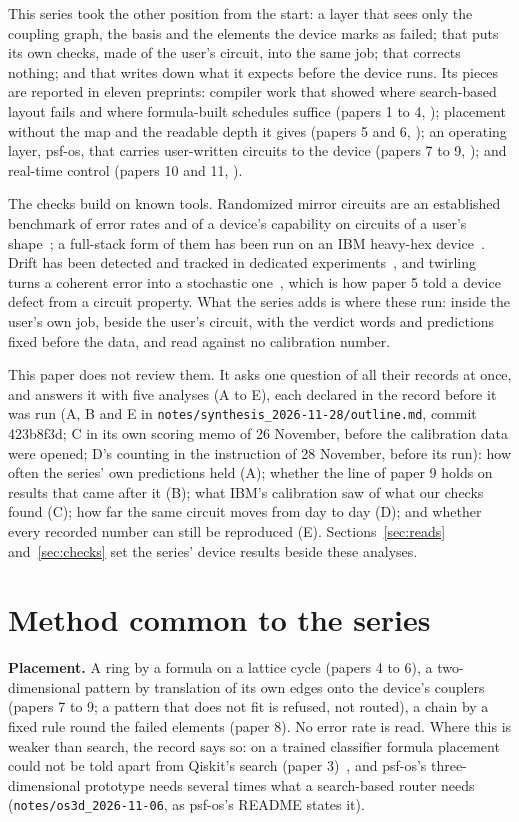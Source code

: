 \documentclass[10pt,a4paper]{article}
\begin{document}
This series took the other position from the start: a layer that sees only the coupling graph, the basis and the
elements the device marks as failed; that puts its own checks, made of the user's circuit, into the same job; that
corrects nothing; and that writes down what it expects before the device runs. Its pieces are reported in eleven
preprints: compiler work that showed where search-based layout fails and where formula-built schedules suffice
(papers 1 to 4, \cite{p1,p2,p3,p4}); placement without the map and the readable depth it gives (papers 5 and 6,
\cite{p5,p6}); an operating layer, psf-os, that carries user-written circuits to the device (papers 7 to 9,
\cite{p7,p8,p9}); and real-time control (papers 10 and 11, \cite{p10,p11}).

The checks build on known tools. Randomized mirror circuits are an established benchmark of error rates and of a device's
capability on circuits of a user's shape~\cite{proctor2022prl,proctor2022natphys}; a
full-stack form of them has been run on an IBM heavy-hex device~\cite{hines2023}. Drift has been detected and tracked in
dedicated experiments~\cite{proctor2020drift}, and twirling turns a coherent error into a
stochastic one~\cite{wallman2016,hashim2021}, which is how paper 5 told a device defect from a circuit property. What
the series adds is where these run: inside the user's own job, beside the user's circuit, with the verdict words and
predictions fixed before the data, and read against no calibration number.

This paper does not review them. It asks one question of all their records at once, and answers it with five analyses
(A to E), each declared in the record before it was run (A, B and E in
\texttt{notes/synthesis\_2026-11-28/outline.md}, commit 423b8f3d; C in its own scoring memo of 26 November, before the
calibration data were opened; D's counting in the instruction of 28 November, before its run):
how often the series' own predictions held (A); whether the line of paper 9 holds on results that came after it (B);
what IBM's calibration saw of what our checks found (C); how far the same circuit moves from day to day (D); and
whether every recorded number can still be reproduced (E). Sections~\ref{sec:reads} and~\ref{sec:checks} set the
series' device results beside these analyses.

\section{Method common to the series}\label{sec:method}
\textbf{Placement.} A ring by a formula on a lattice cycle (papers 4 to 6), a two-dimensional pattern by translation
of its own edges onto the device's couplers (papers 7 to 9; a pattern that does not fit is refused, not routed), a
chain by a fixed rule round the failed elements (paper 8). No error rate is read. Where this is weaker than search, the
record says so: on a trained classifier formula placement could not be told apart from Qiskit's search
(paper 3)~\cite{p3}, and psf-os's three-dimensional prototype needs several times what a search-based router needs
(\texttt{notes/os3d\_2026-11-06}, as psf-os's README states it).
\end{document}
